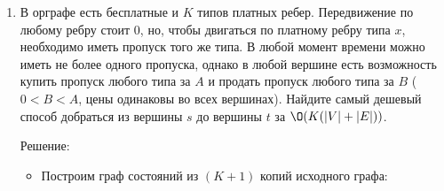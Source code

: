 \begin{enumerate}
\begin{itemize}
      \item Алгоритм:

      \begin{lstlisting}[language=Python]
import heapq

def dijkstra(graph, start, p):
    dist = [float('inf')] * len(graph)
    dist[start] = 0

    count = [0] * len(graph)
    count[start] = 1

    heap = [(0, start)]

    while heap:
        curr_dist, vertex = heapq.heappop(heap)
        
        if curr_dist > dist[vertex]:
            continue
            
        for neighbor, weight in graph[vertex]:
            new_dist = curr_dist + weight

            if new_dist < dist[neighbor]:
                dist[neighbor] = new_dist
                count[neighbor] = count[vertex]
                heapq.heappush(heap, (new_dist, neighbor))

            elif new_dist == dist[neighbor]:
                count[neighbor] = (count[neighbor] + count[vertex]) % p
    
    return count

    \end{lstlisting}

    \item Сложность по времени: равна временной сложности алгоритма Дейкстры с бинарной кучей -- $\O(|E|\log|V|)$
    \item Сложность по памяти: $\O(|V|)$ -- маасивы $dist$ и $count$

    \end{itemize}

  \item
    В орграфе есть бесплатные и $K$ типов платных ребер. Передвижение по любому ребру стоит $0$, но,
    чтобы двигаться по платному ребру типа $x$, необходимо иметь пропуск того же типа. 
    В любой момент времени можно иметь не более одного пропуска, 
    однако в любой вершине есть возможность купить пропуск любого типа за $A$ и 
    продать пропуск любого типа за $B$ ($0 < B < A$, цены одинаковы во всех вершинах). 
    Найдите самый дешевый способ добраться из вершины $s$ до вершины $t$ за $\O(K (|V| + |E|))$.

    Решение:

    \begin{itemize}
      \item Построим граф состояний из $(K + 1)$ копий исходного графа:
      \begin{itemize}


\end{itemize}
\end{itemize}
\end{enumerate}
